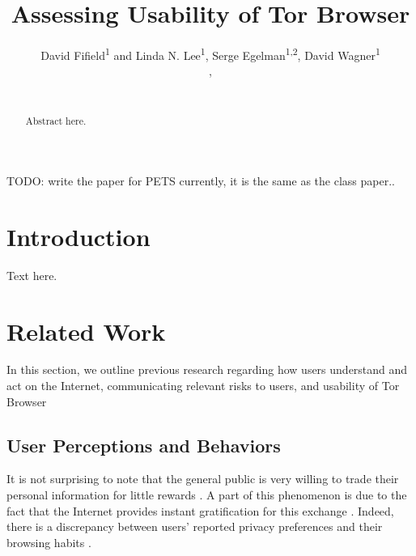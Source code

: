 \documentclass{acm_proc_article-sp}
\begin{document}
\title{Assessing Usability of Tor Browser}
\author{
 \alignauthor David Fifield\textsuperscript{1} and Linda N. Lee\textsuperscript{1}, Serge Egelman\textsuperscript{1,2}, David Wagner\textsuperscript{1}\\
   \vspace{0.5em}
   , \\
   \\
}

\maketitle
{\color {red} TODO: write the paper for PETS currently, it is the same as the class paper..}

\begin{abstract}
Abstract here.
\end{abstract}




\section{Introduction}

Text here.

\section{Related Work}
In this section, we outline previous research regarding how users understand and act on the Internet, communicating relevant risks to users, and usability of Tor Browser

\subsection{User Perceptions and Behaviors}
It is not surprising to note that the general public is very willing to trade their personal information for little rewards \cite{norberg2007privacy}. A part of this phenomenon is due to the fact that the Internet provides instant gratification for this exchange \cite{acquisti2004privacy}. Indeed, there is a discrepancy between users' reported privacy preferences and their browsing habits \cite{jensen2005privacy}. 
\end{document}
